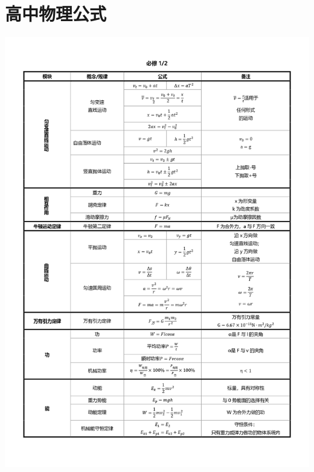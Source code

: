 \documentclass[cn,10.5pt,chinese,mac,chinesefont=founder]{elegantbook}
\begin{document}
\chapter{高中物理公式}
\begin{center}
	\includegraphics[width=6in]{media/b1.jpg}
\end{center}
\end{document}

